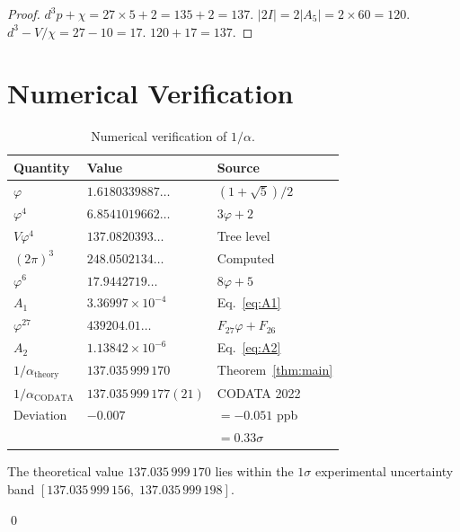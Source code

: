 \documentclass[11pt,a4paper]{article}
\theoremstyle{plain}
\theoremstyle{definition}
\newcommand{\vp}{\varphi}
\begin{document}
\begin{proof}
$d^3 p + \chi = 27 \times 5 + 2 = 135 + 2 = 137$.
$|2I| = 2|A_5| = 2 \times 60 = 120$.
$d^3 - V/\chi = 27 - 10 = 17$.
$120 + 17 = 137$.
\end{proof}

\section{Numerical Verification}\label{sec:verify}

\begin{table}[htbp]
\centering
\caption{Numerical verification of $1/\alpha$.}
\label{tab:verify}
\begin{tabular}{@{}lll@{}}
\toprule
Quantity & Value & Source \\
\midrule
$\vp$ & $1.6180339887\ldots$ & $(1+\sqrt{5})/2$ \\
$\vp^4$ & $6.8541019662\ldots$ & $3\vp + 2$ \\
$V\vp^4$ & $137.0820393\ldots$ & Tree level \\
$(2\pi)^3$ & $248.0502134\ldots$ & Computed \\
$\vp^6$ & $17.9442719\ldots$ & $8\vp + 5$ \\
$A_1$ & $3.36997 \times 10^{-4}$ & Eq.~\eqref{eq:A1} \\
$\vp^{27}$ & $439204.01\ldots$ & $F_{27}\vp + F_{26}$ \\
$A_2$ & $1.13842 \times 10^{-6}$ & Eq.~\eqref{eq:A2} \\
\midrule
$1/\alpha_{\mathrm{theory}}$ & $137.035\,999\,170$ & Theorem~\ref{thm:main} \\
$1/\alpha_{\mathrm{CODATA}}$ & $137.035\,999\,177(21)$ & CODATA 2022 \\
\midrule
Deviation & $-0.007$ & $= -0.051$ ppb \\
 & & $= 0.33\sigma$ \\
\bottomrule
\end{tabular}
\end{table}

The theoretical value $137.035\,999\,170$ lies within the $1\sigma$
experimental uncertainty band $[137.035\,999\,156,\; 137.035\,999\,198]$.

\qed
\end{document}
